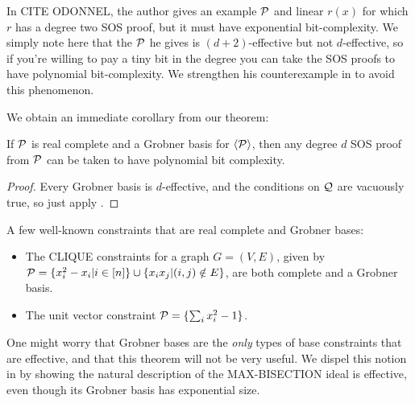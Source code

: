\begin{remark}
In CITE ODONNEL, the author gives an example $\mathcal P$ and linear $r(x)$ for which $r$ has a degree two SOS proof, but it must have exponential bit-complexity. We simply note here that the $\mathcal P$ he gives is $(d+2)$-effective but not $d$-effective, so if you're willing to pay a tiny bit in the degree you can take the SOS proofs to have polynomial bit-complexity. We strengthen his counterexample in  to avoid this phenomenon.
\end{remark}
We obtain an immediate corollary from our theorem:
\begin{corollary}\label{cor:grobner}
If $\mathcal P$ is real complete and a Grobner basis for $\langle \mathcal P\rangle$, then any degree $d$ SOS proof from $\mathcal P$ can be taken to have polynomial bit complexity. 
\end{corollary}
\begin{proof}
Every Grobner basis is $d$-effective, and the conditions on $\mathcal Q$ are vacuously true, so just apply .
\end{proof}
\begin{example}
A few well-known constraints that are real complete and Grobner bases:
\begin{itemize}
\item The CLIQUE constraints for a graph $G = (V,E)$, given by $\mathcal P = \{x_i^2 - x_i | i \in [n]\} \cup \{x_ix_j | (i,j) \notin E\}$, are both complete and a Grobner basis.
\item The unit vector constraint $\mathcal P = \{\sum_i x_i^2 - 1\}$.
\end{itemize}
\end{example}
One might worry that Grobner bases are the \emph{only} types of base constraints that are effective, and that this theorem will not be very useful. We dispel this notion in  by showing the natural description of the MAX-BISECTION ideal is effective, even though its Grobner basis has exponential size. 

